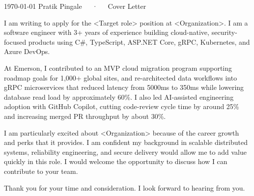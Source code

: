 \documentclass[11pt, a4paper]{awesome-cv}
\begin{document}
\makecvheader[R]

\makecvfooter
  {\today}
  {Pratik Pingale~~~·~~~Cover Letter}
  {}

\makelettertitle

\begin{cvletter}


I am writing to apply for the <Target role> position at <Organization>. I am a software engineer with 3+ years of experience building cloud-native, security-focused products using C\#, TypeScript, ASP.NET Core, gRPC, Kubernetes, and Azure DevOps.

At Emerson, I contributed to an MVP cloud migration program supporting roadmap goals for 1,000+ global sites, and re-architected data workflows into gRPC microservices that reduced latency from 5000ms to 350ms while lowering database read load by approximately 60\%. I also led AI-assisted engineering adoption with GitHub Copilot, cutting code-review cycle time by around 25\% and increasing merged PR throughput by about 30\%.

I am particularly excited about <Organization> because of the career growth and perks that it provides. I am confident my background in scalable distributed systems, reliability engineering, and secure delivery would allow me to add value quickly in this role. I would welcome the opportunity to discuss how I can contribute to your team.

Thank you for your time and consideration. I look forward to hearing from you.

\end{cvletter}


\makeletterclosing
\end{document}
